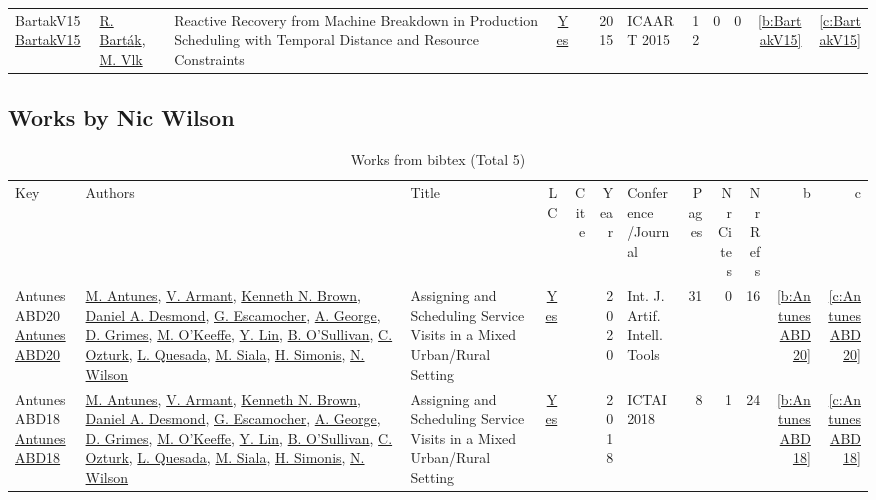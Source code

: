 {\begin{longtable}{>{\raggedright\arraybackslash}p{3cm}>{\raggedright\arraybackslash}p{6cm}>{\raggedright\arraybackslash}p{6.5cm}rrrp{2.5cm}rrrrr}
BartakV15 \href{}{BartakV15} & \hyperref[auth:a153]{R. Bart{\'{a}}k}, \hyperref[auth:a314]{M. Vlk} & Reactive Recovery from Machine Breakdown in Production Scheduling with Temporal Distance and Resource Constraints & \href{works/BartakV15.pdf}{Yes} & \cite{BartakV15} & 2015 & ICAART 2015 & 12 & 0 & 0 & \ref{b:BartakV15} & \ref{c:BartakV15}\\
\end{longtable}
}

\subsection{Works by Nic Wilson}
\label{sec:a838}
{\scriptsize
\begin{longtable}{>{\raggedright\arraybackslash}p{3cm}>{\raggedright\arraybackslash}p{6cm}>{\raggedright\arraybackslash}p{6.5cm}rrrp{2.5cm}rrrrr}
\rowcolor{white}\caption{Works from bibtex (Total 5)}\\ \toprule
\rowcolor{white}Key & Authors & Title & LC & Cite & Year & \shortstack{Conference\\/Journal} & Pages & \shortstack{Nr\\Cites} & \shortstack{Nr\\Refs} & b & c \\ \midrule\endhead
\bottomrule
\endfoot
AntunesABD20 \href{https://doi.org/10.1142/S0218213020600076}{AntunesABD20} & \hyperref[auth:a891]{M. Antunes}, \hyperref[auth:a892]{V. Armant}, \hyperref[auth:a223]{Kenneth N. Brown}, \hyperref[auth:a893]{Daniel A. Desmond}, \hyperref[auth:a894]{G. Escamocher}, \hyperref[auth:a895]{A. George}, \hyperref[auth:a183]{D. Grimes}, \hyperref[auth:a896]{M. O'Keeffe}, \hyperref[auth:a897]{Y. Lin}, \hyperref[auth:a16]{B. O'Sullivan}, \hyperref[auth:a898]{C. Ozturk}, \hyperref[auth:a899]{L. Quesada}, \hyperref[auth:a130]{M. Siala}, \hyperref[auth:a17]{H. Simonis}, \hyperref[auth:a838]{N. Wilson} & Assigning and Scheduling Service Visits in a Mixed Urban/Rural Setting & \href{works/AntunesABD20.pdf}{Yes} & \cite{AntunesABD20} & 2020 & Int. J. Artif. Intell. Tools & 31 & 0 & 16 & \ref{b:AntunesABD20} & \ref{c:AntunesABD20}\\
AntunesABD18 \href{https://doi.org/10.1109/ICTAI.2018.00027}{AntunesABD18} & \hyperref[auth:a891]{M. Antunes}, \hyperref[auth:a892]{V. Armant}, \hyperref[auth:a223]{Kenneth N. Brown}, \hyperref[auth:a893]{Daniel A. Desmond}, \hyperref[auth:a894]{G. Escamocher}, \hyperref[auth:a895]{A. George}, \hyperref[auth:a183]{D. Grimes}, \hyperref[auth:a896]{M. O'Keeffe}, \hyperref[auth:a897]{Y. Lin}, \hyperref[auth:a16]{B. O'Sullivan}, \hyperref[auth:a898]{C. Ozturk}, \hyperref[auth:a899]{L. Quesada}, \hyperref[auth:a130]{M. Siala}, \hyperref[auth:a17]{H. Simonis}, \hyperref[auth:a838]{N. Wilson} & Assigning and Scheduling Service Visits in a Mixed Urban/Rural Setting & \href{works/AntunesABD18.pdf}{Yes} & \cite{AntunesABD18} & 2018 & ICTAI 2018 & 8 & 1 & 24 & \ref{b:AntunesABD18} & \ref{c:AntunesABD18}\\

\end{longtable}}
